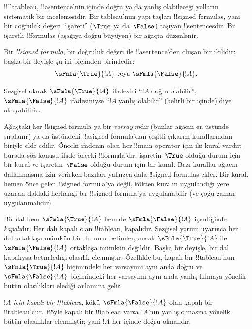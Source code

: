 

      {}
      {}


!!^a{tableau}, !!a{sentence}'nin
 içinde doğru ya da yanlış
olabileceği yolların sistematik bir incelemesidir. Bir tableau'nun yapı
taşları !!{signed formula}s, yani bir doğruluk değeri ``işareti'' ($\True$
ya da~$\False$) taşıyan !!{sentence}s{}dir. Bu işaretli !!{formula}s (aşağıya
doğru büyüyen) bir ağaçta düzenlenir.

\begin{defn}
  Bir \emph{!!{signed formula}}, bir doğruluk değeri ile !!a{sentence}'den
  oluşan bir ikilidir; başka bir deyişle şu iki biçimden birindedir:
  \[
  \sFmla{\True}{!A} \text{ veya } \sFmla{\False}{!A}.
  \]
\end{defn}

Sezgisel olarak $\sFmla{\True}{!A}$ ifadesini ``$!A$ doğru olabilir'',
$\sFmla{\False}{!A}$ ifadesiniyse ``$!A$ yanlış olabilir'' (belirli bir
 içinde) diye okuyabiliriz.

Ağaçtaki her !!{signed formula} ya bir \emph{varsayım}dır (bunlar ağacın en
üstünde sıralanır) ya da üstündeki !!a{signed formula}'dan çeşitli çıkarım
kurallarından biriyle elde edilir. Önceki ifadenin olası her !!{main
operator} için iki kural vardır; burada söz konusu ifade önceki
!!{formula}'dır: işaretin~$\True$ olduğu durum için bir kural ve
işaretin~$\False$ olduğu durum için bir kural. Bazı kurallar
ağacın dallanmasına izin verirken bazıları yalnızca dala !!{signed formula}s
ekler. Bir kural, hemen önce gelen !!{signed formula}'ya değil, kökten
kuralın uygulandığı yere uzanan daldaki herhangi bir !!{signed formula}'ya
uygulanabilir (ve çoğu zaman uygulanmalıdır).

Bir dal hem $\sFmla{\True}{!A}$ hem de $\sFmla{\False}{!A}$ içerdiğinde
\emph{kapalı}dır. Her dalı kapalı olan !!{tableau}, kapalıdır. Sezgisel
yorum uyarınca her dal ortaklaşa mümkün bir durumu betimler; ancak
$\sFmla{\True}{!A}$ ile $\sFmla{\False}{!A}$ ortaklaşa mümkün değildir.
Başka bir deyişle, bir dal kapalıysa betimlediği olasılık elenmiştir.
Özellikle bu, kapalı bir !!{tableau}'nun $\sFmla{\True}{!A}$ biçimindeki her
varsayımı aynı anda doğru ve~$\sFmla{\False}{!A}$ biçimindeki her varsayımı
aynı anda yanlış kılmaya yönelik bütün olasılıkları elediği anlamına gelir.

$!A$ \emph{için kapalı bir !!{tableau}}, kökü~$\sFmla{\False}{!A}$ olan
kapalı bir !!{tableau}'dur. Böyle kapalı bir !!{tableau} varsa $!A$'nın
yanlış olmasına yönelik bütün olasılıklar elenmiştir; yani $!A$ her
 içinde doğru olmalıdır.

